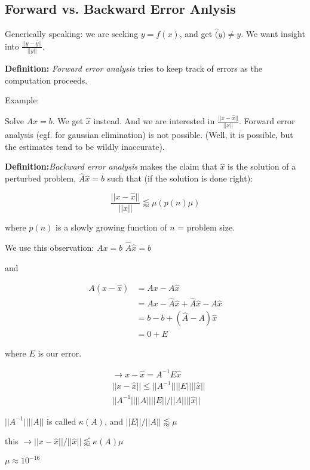 \subsection{Forward vs. Backward Error Anlysis}

Generically speaking: we are seeking $y = f(x)$, and get $\hat(y) \neq y$. We want insight into $\frac{||y - \hat{y}||}{||y||}$. 

\textbf{Definition:} \emph{Forward error analysis} tries to keep track of errors as the computation proceeds. 

Example:

Solve $Ax = b$. We get $\hat{x}$ instead. And we are interested in $\frac{||x -
\hat{x}||}{||x||}$. Forward error analysis (egf. for gaussian elimination) is
not possible. (Well, it is possible, but the estimates tend to be wildly
inaccurate). 

\textbf{Definition:}\emph{Backward error analysis} makes the claim that $\hat{x}$ is the solution of a perturbed problem, $\hat{A}\hat{x} = b$ such that (if the solution is done right):

$$
\frac{||x - \hat{x}||}{||x||} \lessapprox \mu (p(n) \mu)
$$

where $p(n)$ is a slowly growing function of $n$ = problem size. 

We use this observation:
$Ax = b$
$\hat{A}\hat{x} = b$

and 

\begin{align}
A(x - \hat{x}) &= Ax - A\hat{x} \\
& = Ax - \hat{A}\hat{x} + \hat{A}\hat{x} - A\hat{x} \\
& = b - b + (\hat{A} - A)\hat{x} \\
& = 0 + E
\end{align}

where $E$ is our error. 

\begin{align}
& \rightarrow x - \hat{x} = A^{-1}E\hat{x} \\
& || x - \hat{x}|| \le ||A^{-1}|| ||E|| ||\hat{x}|| \\
& ||A^{-1}|| ||A||  ||E|| / ||A|| ||\hat{x} ||
\end{align}

$||A^{-1}|| ||A||$ is called $\kappa(A)$, and $||E||/||A|| \lessapprox \mu$

this $\rightarrow ||x - \hat{x}|| / ||\hat{x}|| \lessapprox \kappa(A) \mu $

$\mu \approx 10^{-16}$

